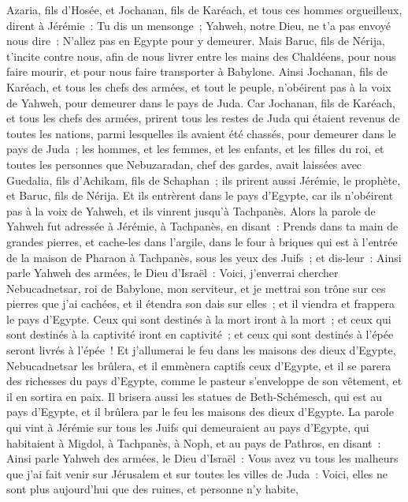 \begin{multicols}{2}
Azaria, fils d'Hosée, et Jochanan, fils de Karéach, et tous ces hommes orgueilleux, dirent à Jérémie~: Tu dis un mensonge~; Yahweh, notre Dieu, ne t'a pas envoyé nous dire~: N'allez pas en Egypte pour y demeurer.
Mais Baruc, fils de Nérija, t'incite contre nous, afin de nous livrer entre les mains des Chaldéens, pour nous faire mourir, et pour nous faire transporter à Babylone.
Ainsi Jochanan, fils de Karéach, et tous les chefs des armées, et tout le peuple, n'obéirent pas à la voix de Yahweh, pour demeurer dans le pays de Juda.
Car Jochanan, fils de Karéach, et tous les chefs des armées, prirent tous les restes de Juda qui étaient revenus de toutes les nations, parmi lesquelles ils avaient été chassés, pour demeurer dans le pays de Juda~;
les hommes, et les femmes, et les enfants, et les filles du roi, et toutes les personnes que Nebuzaradan, chef des gardes, avait laissées avec Guedalia, fils d'Achikam, fils de Schaphan~; ils prirent aussi Jérémie, le prophète, et Baruc, fils de Nérija.
Et ils entrèrent dans le pays d'Egypte, car ils n'obéirent pas à la voix de Yahweh, et ils vinrent jusqu'à Tachpanès.
Alors la parole de Yahweh fut adressée à Jérémie, à Tachpanès, en disant~:
Prends dans ta main de grandes pierres, et cache-les dans l'argile, dans le four à briques qui est à l'entrée de la maison de Pharaon à Tachpanès, sous les yeux des Juifs~;
et dis-leur~: Ainsi parle Yahweh des armées, le Dieu d'Israël~: Voici, j'enverrai chercher Nebucadnetsar, roi de Babylone, mon serviteur, et je mettrai son trône sur ces pierres que j'ai cachées, et il étendra son dais sur elles~;
et il viendra et frappera le pays d'Egypte. Ceux qui sont destinés à la mort iront à la mort~; et ceux qui sont destinés à la captivité iront en captivité~; et ceux qui sont destinés à l'épée seront livrés à l'épée~!
Et j'allumerai le feu dans les maisons des dieux d'Egypte, Nebucadnetsar les brûlera, et il emmènera captifs ceux d'Egypte, et il se parera des richesses du pays d'Egypte, comme le pasteur s'enveloppe de son vêtement, et il en sortira en paix.
Il brisera aussi les statues de Beth-Schémesch, qui est au pays d'Egypte, et il brûlera par le feu les maisons des dieux d'Egypte.
\VerseOne{}La parole qui vint à Jérémie sur tous les Juifs qui demeuraient au pays d'Egypte, qui habitaient à Migdol, à Tachpanès, à Noph, et au pays de Pathros, en disant~:
Ainsi parle Yahweh des armées, le Dieu d'Israël~: Vous avez vu tous les malheurs que j'ai fait venir sur Jérusalem et sur toutes les villes de Juda~: Voici, elles ne sont plus aujourd'hui que des ruines, et personne n'y habite,

\end{multicols}

